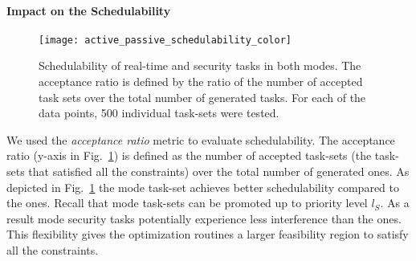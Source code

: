 \documentclass[../rt_server_main.tex]{subfiles}
\begin{document}
\paragraph{Impact on the Schedulability}


\begin{figure}[!t]
\centering
\texttt{[image: active\_passive\_schedulability\_color]}
\caption{Schedulability of real-time and security tasks in both modes. The acceptance ratio is defined by the ratio of the number of accepted
task sets over the total number of generated tasks. For each of the data points, 500 individual task-sets were tested.}
\label{fig:active_passive_sched}
\vspace{-1.0\baselineskip}
\end{figure}


We used the \textit{acceptance ratio}
metric to evaluate schedulability. The acceptance ratio (y-axis in Fig.~\ref{fig:active_passive_sched}) is defined as the number of accepted task-sets (\eg the task-sets that satisfied all the constraints) over the total number of generated ones. As depicted in Fig.~\ref{fig:active_passive_sched} the \ave mode task-set achieves better schedulability compared to the \pve ones. Recall that \ave mode task-sets can be promoted up to priority level $l_S$. As a result \ave mode security tasks potentially experience less interference than the \pve ones. This flexibility gives the optimization routines a larger  feasibility region to satisfy all the constraints. %






%





 
\end{document}
